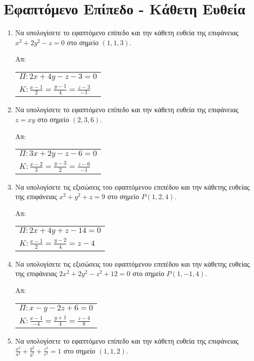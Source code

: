  

\section*{Εφαπτόμενο Επίπεδο - Κάθετη Ευθεία}

\begin{enumerate}
  \item Να υπολογίσετε το εφαπτόμενο επίπεδο και την κάθετη ευθεία της επιφάνειας 
    $ x^{2}+2y^{2}-z = 0 $ στο σημείο $ (1,1,3) $.

    \hfill Απ: \begin{tabular}{l}
      $ \Pi : 2x+4y-z -3 = 0 $ \\
      $ K : \frac{x-1}{2} = \frac{y-1}{4} = \frac{z-3}{-1} $
    \end{tabular} 

  \item Να υπολογίσετε το εφαπτόμενο επίπεδο και την κάθετη ευθεία της επιφάνειας 
    $ z = xy $ στο σημείο $ (2,3,6) $.

    \hfill Απ: \begin{tabular}{l}
      $ \Pi : 3x+2y-z-6 = 0 $ \\
      $ K : \frac{x-2}{3} = \frac{y-3}{2} = \frac{z-6}{-1} $
    \end{tabular} 

  \item Να υπολογίσετε τις εξισώσεις του εφαπτόμενου επιπέδου και την κάθετης ευθείας 
    της επιφάνειας $ x^{2} + y^{2} + z = 9 $ στο σημείο $ P(1,2,4) $.

    \hfill Απ: \begin{tabular}{l}
      $ \Pi : 2x+4y+z-14=0 $ \\
      $ K : \frac{x-1}{2} = \frac{y-2}{4} = z-4 $
    \end{tabular} 

  \item Να υπολογίσετε τις εξισώσεις του εφαπτόμενου επιπέδου και την κάθετης ευθείας 
    της επιφάνειας $ 2x^{2} + 2y^{2} - z^{2} +12=0 $ στο σημείο $ P(1,-1,4) $.

    \hfill Απ: \begin{tabular}{l}
      $ \Pi : x-y-2z+6=0 $ \\
      $ K : \frac{x-1}{-4} = \frac{y+1}{4} = \frac{z-4}{8} $
    \end{tabular} 

  \item Να υπολογίσετε το εφαπτόμενο επίπεδο και την κάθετη ευθεία της επιφάνειας 
    $ \frac{x^{2}}{a^{2}} + \frac{y^{2}}{b^{2}} + \frac{z^{2}}{c^{2}} = 1  $ στο σημείο 
    $ (1,1,2) $.


\end{enumerate}
